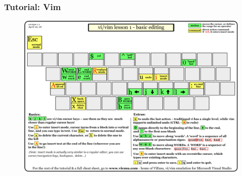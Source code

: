 \documentclass[hyperref={colorlinks=false},handout,10pt]{beamer}
\begin{document}
\begin{frame}
    \frametitle{Tutorial: Vim}
    \begin{figure}
        \begin{center}
            \includegraphics[width=\textwidth]{images/vi-vim-tutorial-1.png}
        \end{center}
    \end{figure}
\end{frame}
\end{document}
